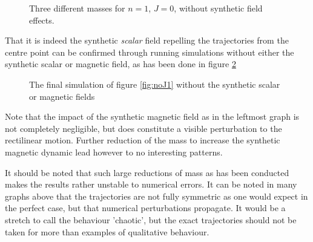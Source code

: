 \documentclass[main.tex]{subfiles}
\begin{document}
\begin{figure}[h]
    \centering
    \qquad
    \qquad
    \caption{\centering Three different masses for \(n = 1\), \(J = 0\), without synthetic field
    effects.}%
    \label{fig:noJ2}
\end{figure}

That it is indeed the synthetic \textit{scalar} field repelling the trajectories from the
centre point can be confirmed through running simulations without either the synthetic
scalar or magnetic field, as has been done in figure \ref{fig:noJ3}

\begin{figure}[h]
    \centering
    \qquad
    \caption{\centering The final simulation of figure \ref{fig:noJ1} without the synthetic scalar or
    magnetic fields}%
    \label{fig:noJ3}
\end{figure}
Note that the impact of the synthetic magnetic field as in the leftmost graph is not
completely negligible, but does constitute a visible perturbation to the rectilinear
motion. Further reduction of the mass to increase the synthetic magnetic dynamic lead
however to no interesting patterns.

It should be noted that such large reductions of mass as has been conducted makes the
results rather unstable to numerical errors. It can be noted in many graphs above that the
trajectories are not fully symmetric as one would expect in the perfect case, but that
numerical perturbations propagate. It would be a stretch to call the behaviour 'chaotic',
but the exact trajectories should not be taken for more than examples of qualitative
behaviour.
\end{document}
